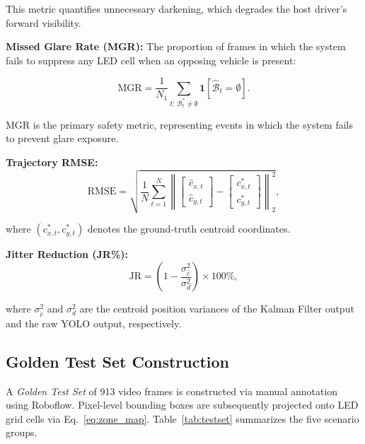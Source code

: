 \documentclass{jstarticle}
\theoremstyle{remark}
\begin{document}
This metric quantifies unnecessary darkening, which degrades the host
driver's forward visibility.

\medskip
\noindent\textbf{Missed Glare Rate (MGR):}
The proportion of frames in which the system fails to suppress any LED
cell when an opposing vehicle is present:

\begin{equation}
\mathrm{MGR} = \frac{1}{N_1}
\sum_{t:\, \mathcal{B}^{*}_t \neq \emptyset}
\mathbf{1}\!\left[\hat{\mathcal{B}}_t = \emptyset\right].
\label{eq:mgr}
\end{equation}

MGR is the primary safety metric, representing events in which the
system fails to prevent glare exposure.

\medskip
\noindent\textbf{Trajectory RMSE:}
\begin{equation}
\mathrm{RMSE} = \sqrt{
  \frac{1}{N} \sum_{t=1}^{N}
  \left\|
    \begin{bmatrix}\hat{c}_{x,t} \\ \hat{c}_{y,t}\end{bmatrix}
    -
    \begin{bmatrix}c^{*}_{x,t} \\ c^{*}_{y,t}\end{bmatrix}
  \right\|_2^2
},
\label{eq:rmse}
\end{equation}

\noindent where $(c^{*}_{x,t}, c^{*}_{y,t})$ denotes the
ground-truth centroid coordinates.

\medskip
\noindent\textbf{Jitter Reduction (JR\%):}
\begin{equation}
\mathrm{JR} = \left(1 -
  \frac{\sigma_{\hat{c}}^2}{\sigma_{d}^2}
\right) \times 100\%,
\label{eq:jitter}
\end{equation}

\noindent where $\sigma_{\hat{c}}^2$ and $\sigma_{d}^2$ are the
centroid position variances of the Kalman Filter output and the raw
YOLO output, respectively.

\subsection{Golden Test Set Construction}
\label{subsec:testset}

A \emph{Golden Test Set} of 913 video frames is constructed via manual
annotation using Roboflow. Pixel-level bounding
boxes are subsequently projected onto LED grid cells via
Eq.~\eqref{eq:zone_map}. Table~\ref{tab:testset} summarizes the five
scenario groups.
\end{document}

